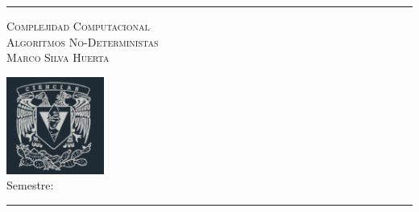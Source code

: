 \begin{center}
        \rule[1.5ex]{1\linewidth}{0.5mm} 
\end{center}

\begin{minipage}{12cm}
    {\Large\textsc{Complejidad Computacional}} \\

    {\large\textsc{Algoritmos No-Deterministas}}\\            
    
    {\large \textsc{Marco Silva Huerta}}\\ 
        
\end{minipage}
\begin{minipage}{4.1cm}
    \includegraphics[height=3.2cm]{assets/imagenes/cienciasBLRY.png}\\    
    Semestre: \semestre
\end{minipage}

\begin{center}
    \rule[1.5ex]{1\linewidth}{0.5mm} 
\end{center}
